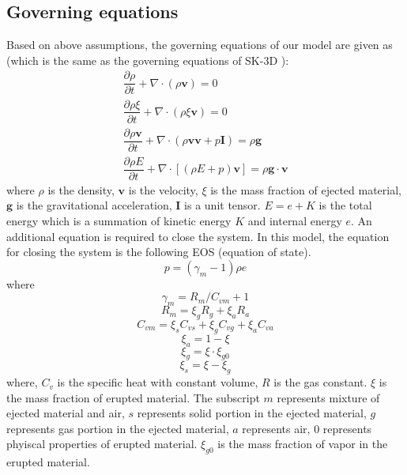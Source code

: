 \documentclass[gmd, manuscript]{copernicus}
\begin{document}
\subsection{Governing equations}
Based on above assumptions, the governing equations of our model are given as (which is the same as the governing equations of SK-3D \citep{suzuki2005numerical}):
\begin{align}
\dfrac{\partial \rho}{\partial t} + \nabla \cdot \left(\rho \textbf{v}\right) = 0 \label{eq:gov-cs-rho} \\
\dfrac{\partial \rho \xi}{\partial t} + \nabla \cdot \left(\rho \xi \textbf{v}\right) = 0 \label{eq:gov-cs-ks}\\
\dfrac{\partial \rho \textbf{v}}{\partial t} + \nabla \cdot \left(\rho \textbf{v} \textbf{v} + p\textbf{I}\right) = \rho \textbf{g} \label{eq:gov-cs-v} \\
\dfrac{\partial \rho E}{\partial t} + \nabla \cdot \left[\left(\rho E + p \right)\textbf{v}\right] = \rho \textbf{g} \cdot\textbf{v} \label{eq:gov-cs-e}
\end{align}
where $\rho$ is the density, $\textbf{v}$ is the velocity, $\xi$ is the mass fraction of ejected material, $\textbf{g}$ is the gravitational acceleration, $\textbf{I}$ is a unit tensor.
$E = e + K $ is the total energy which is a summation of kinetic energy $K$ and internal energy $e$.
An additional equation is required to close the system. In this model, the equation for closing the system is the following EOS (equation of state).
\begin{equation}
p = \left(\gamma_m - 1\right)\rho e \label{eq:EOS}
\end{equation}
where 
\begin{equation}
\gamma_m = R_m/C_{vm} + 1 \label{eq:gov-gm}
\end{equation}
\begin{equation}
R_m = \xi_g R_g + \xi_a R_a  \label{eq:gov-Rm}
\end{equation}
\begin{equation}
C_{vm} = \xi_s C_{vs} + \xi_g C_{vg} + \xi_a C_{va} \label{eq:gov-Cvm}
\end{equation}
\begin{equation}
\xi_a = 1 - \xi \label{eq:gov-na}
\end{equation}
\begin{equation}
\xi_g = \xi \cdot \xi_{g0} \label{eq:gov-ng}
\end{equation}
\begin{equation}
\xi_s = \xi - \xi_g \label{eq:gov-ns}
\end{equation}
where, $C_v$ is the specific heat with constant volume, $R$ is the gas constant. $\xi$ is the mass fraction of erupted material. The subscript $m$ represents mixture of ejected material and air, $s$ represents solid portion in the ejected material, $g$ represents gas portion in the ejected material, $a$ represents air, $0$ represents phyiscal properties of erupted material. $\xi_{g0}$ is the mass fraction of vapor in the erupted material.
\end{document}
